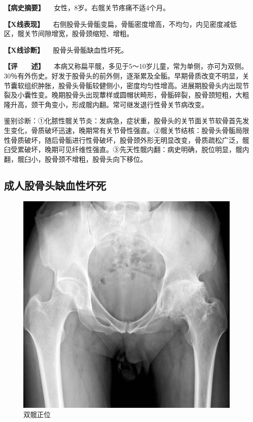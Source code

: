 \textbf{【病史摘要】} 　女性，8岁。右髋关节疼痛不适4个月。

\textbf{【X线表现】}
　右侧股骨头骨骺变扁，骨骺密度增高，不均匀，内见密度减低区，髋关节间隙增宽，股骨颈缩短、增粗。

\textbf{【X线诊断】} 　股骨头骨骺缺血性坏死。

\textbf{【评　　述】}
　本病又称扁平髋，多见于5～10岁儿童，常为单侧，亦可为双侧。30％有外伤史。好发于股骨头的前外侧，逐渐累及全骺。早期骨质改变不明显，关节囊软组织肿胀，股骨头骨骺较健侧小，密度均匀性增高。进展期股骨头内出现节裂及小囊性变。晚期股骨头出现蕈样或圆帽状畸形，骨骺碎裂，股骨颈短粗，大粗隆升高，颈干角变小，形成髋内翻。常可继发退行性骨关节病改变。

鉴别诊断：①化脓性髋关节炎：发病急，症状重，股骨头的关节面关节软骨首先发生变化，骨质破坏迅速，晚期常有关节骨性强直。②髋关节结核：股骨头骨骺局限性骨质破坏，随后骨骺进行性骨破坏，股骨颈外形无明显改变，骨质疏松广泛，髋臼受累破坏，晚期可见纤维性强直。③先天性髋内翻：病史明确，脱位明显，髋内翻，髋臼小，股骨颈不增粗，股骨头向下移位。

\subsection{成人股骨头缺血性坏死}

\begin{figure}[!htbp]
 \centering
 \includegraphics{./images/Image00063.jpg}
 \captionsetup{justification=centering}
 \caption{双髋正位}
 \label{fig2-4-2}
  \end{figure} 

